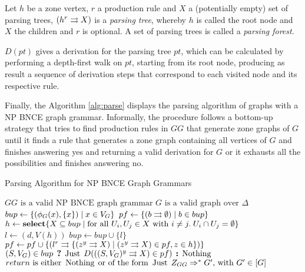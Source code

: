 \begin{definition}
	Let $h$ be a zone vertex, $r$ a production rule and $X$ a (potentially empty) set of parsing trees, $\ptree{h}{r}{X}$ is a \emph{parsing tree}, whereby $h$ is called the root node and $X$ the children and $r$ is optional. A set of parsing trees is called a \emph{parsing forest}.
\end{definition}

$D(pt)$ gives a derivation for the parsing tree $pt$, which can be calculated by performing a depth-first walk on $pt$, starting from its root node, producing as result a sequence of derivation steps that correspond to each visited node and its respective rule.

Finally, the Algorithm \ref{alg:parse} displays the parsing algorithm of graphs with a NP BNCE graph grammar. Informally, the procedure follows a bottom-up strategy that tries to find production rules in $GG$ that generate zone graphs of $G$ until it finds a rule that generates a zone graph containing all vertices of $G$ and finishes answering yes and returning a valid derivation for $G$ or it exhausts all the possibilities and finishes answering no.

\begin{algorithm}[!h]
	\caption{Parsing Algorithm for NP BNCE Graph Grammars}
	\begin{algorithmic}[1]
		\Require $GG \text{ is a valid NP BNCE graph grammar}$
		\Require $G \text{ is a valid graph over } \Delta$ 
			\State $bup \gets \{(\phi_G(x),\{x\}) \; | \; x \in V_G\}$ 
			\State $pf \gets \{ \ptree{b}{}{\emptyset} \st b \in bup \}$ 
			\Repeat
				\State $h \gets \text{\textbf{select}} \{X \subseteq bup \; | \;\text{for all } U_i, U_j \in X \text{ with } i \neq j . \; U_i \cap U_j = \emptyset \}$
				 
						\State $l \gets (d,V(h))$
							\State $bup \gets bup \cup \{l\}$ 
							\State $pf \gets pf \cup \{ \ptree{l}{r}{\{\ptree{z}{y}{X} \st \ptree{z}{y}{X} \in pf, z \in h \}} \}$
						\EndIf
					\EndFor
				\EndFor
			 
			\State \Return $(S, V_G) \in bup \? \Just D(\ptree{(S,V_G)}{y}{X} \in pf) \: \Nothing $
		\EndFunction
		\Ensure $return \text{ is either } \operatorname{\text{Nothing}}\; \text{or of the form } \operatorname{\text{Just}}\; Z_{GG} \Rightarrow^*_{} G'  \text{, with } G' \in [G]$
	\end{algorithmic}
	\label{alg:parse}
\end{algorithm}

